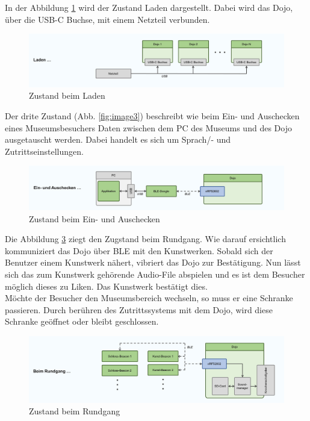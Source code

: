 \documentclass[10pt,a4paper,oneside]{99_fhnwreport}
\begin{document}
In der Abbildung \ref{fig:image2} wird der Zustand Laden dargestellt. Dabei wird das Dojo, über die USB-C Buchse, mit einem Netzteil verbunden.

\begin{figure}[htb]
\includegraphics[width=\textwidth]{Zustand_Laden.png}
\caption{Zustand beim Laden} %
\label{fig:image2}
\end{figure}

Der drite Zustand (Abb. \ref{fig:image3}) beschreibt wie beim Ein- und Auschecken eines Museumsbesuchers Daten zwischen dem PC des Museums und des Dojo ausgetauscht werden. Dabei handelt es sich um Sprach/- und Zutrittseinstellungen.

\begin{figure}[htb]
\includegraphics[width=\textwidth]{Zustand_Ein_Aus_Checken.png}
\caption{Zustand beim Ein- und Auschecken} %
\label{fig:image1}
\end{figure}

Die Abbildung \ref{fig:image4} ziegt den Zugstand beim Rundgang. Wie darauf ersichtlich kommuniziert das Dojo über BLE mit den Kunstwerken. Sobald sich der Benutzer einem Kunstwerk nähert, vibriert das Dojo zur Bestätigung. Nun lässt sich das zum Kunstwerk gehörende Audio-File abspielen und es ist dem Besucher möglich dieses zu Liken. Das Kunstwerk bestätigt dies.\\
Möchte der Besucher den Museumsbereich wechseln, so muss er eine Schranke passieren. Durch berühren des Zutrittssystems mit dem Dojo, wird diese Schranke geöffnet oder bleibt geschlossen.

\begin{figure}[htb]
\includegraphics[width=\textwidth]{Zustand_Rundgang.png}
\caption{Zustand beim Rundgang} %
\label{fig:image4}
\end{figure}
\end{document}
